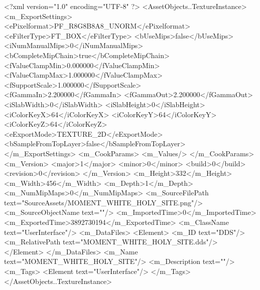 <?xml version="1.0" encoding="UTF-8" ?>
<AssetObjects..TextureInstance>
	<m_ExportSettings>
		<ePixelformat>PF_R8G8B8A8_UNORM</ePixelformat>
		<eFilterType>FT_BOX</eFilterType>
		<bUseMips>false</bUseMips>
		<iNumManualMips>0</iNumManualMips>
		<bCompleteMipChain>true</bCompleteMipChain>
		<fValueClampMin>0.000000</fValueClampMin>
		<fValueClampMax>1.000000</fValueClampMax>
		<fSupportScale>1.000000</fSupportScale>
		<fGammaIn>2.200000</fGammaIn>
		<fGammaOut>2.200000</fGammaOut>
		<iSlabWidth>0</iSlabWidth>
		<iSlabHeight>0</iSlabHeight>
		<iColorKeyX>64</iColorKeyX>
		<iColorKeyY>64</iColorKeyY>
		<iColorKeyZ>64</iColorKeyZ>
		<eExportMode>TEXTURE_2D</eExportMode>
		<bSampleFromTopLayer>false</bSampleFromTopLayer>
	</m_ExportSettings>
	<m_CookParams>
		<m_Values/>
	</m_CookParams>
	<m_Version>
		<major>1</major>
		<minor>0</minor>
		<build>0</build>
		<revision>0</revision>
	</m_Version>
	<m_Height>332</m_Height>
	<m_Width>456</m_Width>
	<m_Depth>1</m_Depth>
	<m_NumMipMaps>0</m_NumMipMaps>
	<m_SourceFilePath text="SourceAssets/MOMENT_WHITE_HOLY_SITE.png"/>
	<m_SourceObjectName text=""/>
	<m_ImportedTime>0</m_ImportedTime>
	<m_ExportedTime>3892730194</m_ExportedTime>
	<m_ClassName text="UserInterface"/>
	<m_DataFiles>
		<Element>
			<m_ID text="DDS"/>
			<m_RelativePath text="MOMENT_WHITE_HOLY_SITE.dds"/>
		</Element>
	</m_DataFiles>
	<m_Name text="MOMENT_WHITE_HOLY_SITE"/>
	<m_Description text=""/>
	<m_Tags>
		<Element text="UserInterface"/>
	</m_Tags>
</AssetObjects..TextureInstance>

